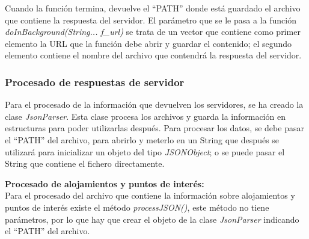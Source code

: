 Cuando la función termina, devuelve el \enquote{PATH} donde está guardado el archivo que contiene la respuesta del servidor. El parámetro que se le pasa a la función \textit{doInBackground(String... f\_url)} se trata de un vector que contiene como primer elemento la URL que la función debe abrir y guardar el contenido; el segundo elemento contiene el nombre del archivo que contendrá la respuesta del servidor.
\subsubsection{Procesado de respuestas de servidor}
Para el procesado de la información que devuelven los servidores, se ha creado la clase \textit{JsonParser}. Esta clase procesa los archivos y guarda la información en estructuras para poder utilizarlas después. Para procesar los datos, se debe pasar el \enquote{PATH} del archivo, para abrirlo y meterlo en un String que después se utilizará para inicializar un objeto del tipo \textit{JSONObject}; o se puede pasar el String que contiene el fichero directamente.\newline

\vspace{0.06in}
\textbf{Procesado de alojamientos y puntos de interés:}\\
Para el procesado del archivo que contiene la información sobre alojamientos y puntos de interés existe el método \textit{processJSON()}, este método no tiene parámetros, por lo que hay que crear el objeto de la clase \textit{JsonParser} indicando el \enquote{PATH} del archivo.\newline

